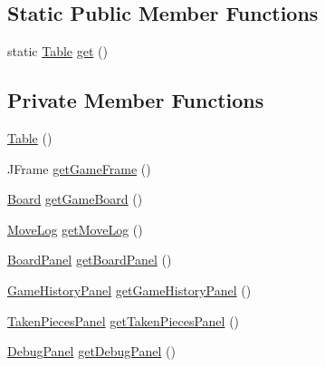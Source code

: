 \subsection*{Static Public Member Functions}
\begin{DoxyCompactItemize}
\item 
static \mbox{\hyperlink{classcom_1_1chess_1_1gui_1_1_table}{Table}} \mbox{\hyperlink{classcom_1_1chess_1_1gui_1_1_table_a8b935f808d6bd95f98aba49cc32a9ab7}{get}} ()
\end{DoxyCompactItemize}
\subsection*{Private Member Functions}
\begin{DoxyCompactItemize}
\item 
\mbox{\hyperlink{classcom_1_1chess_1_1gui_1_1_table_a3d374cfb954be2648c1081971d7e5965}{Table}} ()
\item 
J\+Frame \mbox{\hyperlink{classcom_1_1chess_1_1gui_1_1_table_a6ad61ce575445fb93d142ab43cf8c976}{get\+Game\+Frame}} ()
\item 
\mbox{\hyperlink{classcom_1_1chess_1_1engine_1_1classic_1_1board_1_1_board}{Board}} \mbox{\hyperlink{classcom_1_1chess_1_1gui_1_1_table_a1bbfd084b475f295f96d2873ebbf8ffe}{get\+Game\+Board}} ()
\item 
\mbox{\hyperlink{classcom_1_1chess_1_1gui_1_1_table_1_1_move_log}{Move\+Log}} \mbox{\hyperlink{classcom_1_1chess_1_1gui_1_1_table_a46664408d95029ee21c806d7d0b0b36d}{get\+Move\+Log}} ()
\item 
\mbox{\hyperlink{classcom_1_1chess_1_1gui_1_1_table_1_1_board_panel}{Board\+Panel}} \mbox{\hyperlink{classcom_1_1chess_1_1gui_1_1_table_abf14381b040be69865b1696056a6a9a4}{get\+Board\+Panel}} ()
\item 
\mbox{\hyperlink{classcom_1_1chess_1_1gui_1_1_game_history_panel}{Game\+History\+Panel}} \mbox{\hyperlink{classcom_1_1chess_1_1gui_1_1_table_a98fa709171685b133785b0d3e748c3bf}{get\+Game\+History\+Panel}} ()
\item 
\mbox{\hyperlink{classcom_1_1chess_1_1gui_1_1_taken_pieces_panel}{Taken\+Pieces\+Panel}} \mbox{\hyperlink{classcom_1_1chess_1_1gui_1_1_table_a33a2dff8e6a895ed1e78fbff2fcb09a0}{get\+Taken\+Pieces\+Panel}} ()
\item 
\mbox{\hyperlink{classcom_1_1chess_1_1gui_1_1_debug_panel}{Debug\+Panel}} \mbox{\hyperlink{classcom_1_1chess_1_1gui_1_1_table_a1e5616c89c460dbe22bc0109067ee4a6}{get\+Debug\+Panel}} ()
\item 

\end{DoxyCompactItemize}
